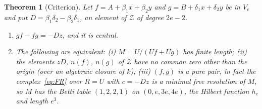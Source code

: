 \documentclass[11pt]{article}
\newtheorem{thmletter}{Theorem}
\theoremstyle{definition}
\theoremstyle{remark}
\begin{document}
\begin{thmletter}[Criterion]\label{thm:crit}
Let $f=A+\beta_1x+\beta_2y$ and $g=B+\delta_1x+\delta_2y$ be in $V_e$ and put $D=\beta_1\delta_2-\beta_2\delta_1$, an element of $\mathcal Z$ of degree $2e-2$.
\begin{enumerate}
\item[(a)] $gf-fg=-Dz$, and it is central.
\item[(b)] The following are equivalent: (i) $M=U/(Uf+Ug)$ has finite length; (ii) the elements $zD$, $n(f)$, $n(g)$ of $\mathcal Z$ have no common zero other than the origin (over an algebraic closure of $k$); (iii) $(f,g)$ is a pure pair, in fact the complex~\eqref{eq:FR} over $R=U$ with $c=-Dz$ is a minimal free resolution of $M$, so $M$ has the Betti table $(1,2,2,1)$ on $(0,e,3e,4e)$, the Hilbert function $h_e$ and length $e^3$.
\end{enumerate}
\end{thmletter}
\end{document}
